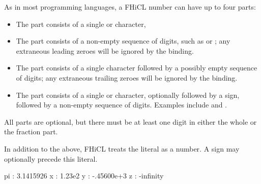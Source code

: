 \documentclass{memarticle}
\newcommand{\fhicl}%
 {FHiCL\xspace}
\begin{document}
As in most programming languages,
a \fhicl number
can have up to four parts:
\begin{itemize}
  \item The  part consists of
        a single \fclcode{+} or \fclcode{-} character,
  \item The  part consists of
        a non-empty sequence of digits,
        such as  or ;
        any extraneous leading zeroes
        will be ignored by the binding.
  \item The  part consists of
        a single  character
        followed by
        a possibly empty sequence of digits;
        any extraneous trailing zeroes
        will be ignored by the binding.
  \item The  part consists of
        a single  or  character,
        optionally followed by a sign,
        followed by
        a non-empty sequence of digits.
        Examples include  and .
\end{itemize}
All parts are optional,
but there must be
at least one digit
in either the whole or the fraction part.

In addition to the above,
\fhicl treats the literal 
as a number.
A sign
may optionally precede this literal.
%
%
\Needspace{0.67in}
\begin{fcllisting}[texcl,escapechar=`]
pi : 3.1415926
x  : 1.23e2
y  : -.45600e+3
z  : -infinity
\end{fcllisting}
\end{document}
